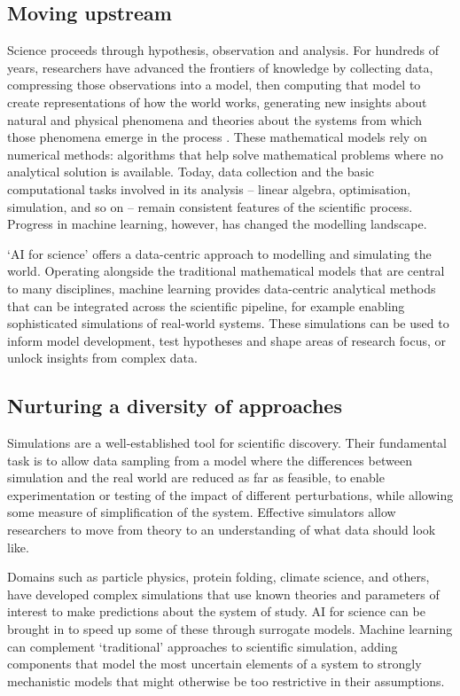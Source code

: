 \subsection{Moving upstream}\label{moving-upstream}

Science proceeds through hypothesis, observation and analysis. For
hundreds of years, researchers have advanced the frontiers of knowledge
by collecting data, compressing those observations into a model, then
computing that model to create representations of how the world works,
generating new insights about natural and physical phenomena and
theories about the systems from which those phenomena emerge in the
process \citep{Blei-build}.
These mathematical models rely on numerical methods: algorithms that
help solve mathematical problems where no analytical solution is
available. Today, data collection and the basic computational tasks
involved in its analysis -- linear algebra, optimisation, simulation,
and so on -- remain consistent features of the scientific process.
Progress in machine learning, however, has changed the modelling
landscape.

`AI for science' offers a data-centric approach to modelling and
simulating the world. Operating alongside the traditional mathematical
models that are central to many disciplines, machine learning provides
data-centric analytical methods that can be integrated across the
scientific pipeline, for example enabling sophisticated simulations of
real-world systems. These simulations can be used to inform model
development, test hypotheses and shape areas of research focus, or
unlock insights from complex data.

\subsection{Nurturing a diversity of
approaches}\label{nurturing-a-diversity-of-approaches}

Simulations are a well-established tool for scientific discovery. Their
fundamental task is to allow data sampling from a model where the
differences between simulation and the real world are reduced as far as
feasible, to enable experimentation or testing of the impact of
different perturbations, while allowing some measure of simplification
of the system. Effective simulators allow researchers to move from
theory to an understanding of what data should look like.

Domains such as particle physics, protein folding, climate science, and
others, have developed complex simulations that use known theories and
parameters of interest to make predictions about the system of study. AI
for science can be brought in to speed up some of these through
surrogate models. Machine learning can complement `traditional'
approaches to scientific simulation, adding components that model the
most uncertain elements of a system to strongly mechanistic models that
might otherwise be too restrictive in their assumptions.

